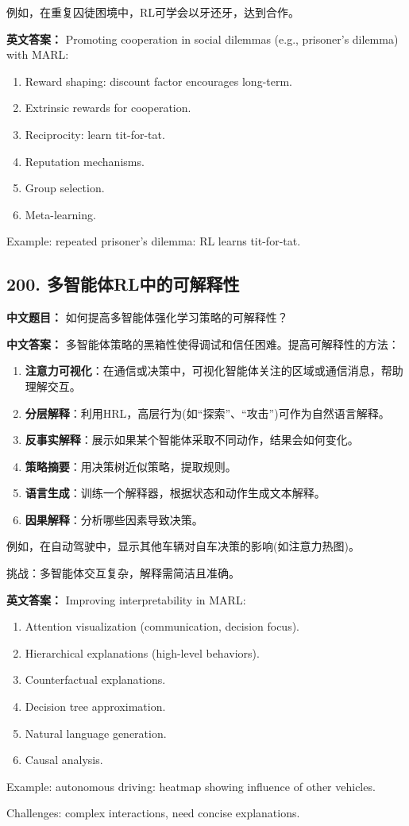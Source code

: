 \documentclass[10pt,a4paper]{ctexart}
\begin{document}
例如，在重复囚徒困境中，RL可学会以牙还牙，达到合作。

\textbf{英文答案：}  
Promoting cooperation in social dilemmas (e.g., prisoner's dilemma) with MARL:

\begin{enumerate}
    \item Reward shaping: discount factor encourages long-term.
    \item Extrinsic rewards for cooperation.
    \item Reciprocity: learn tit-for-tat.
    \item Reputation mechanisms.
    \item Group selection.
    \item Meta-learning.
\end{enumerate}

Example: repeated prisoner's dilemma: RL learns tit-for-tat.

\subsection*{200. 多智能体RL中的可解释性}
\textbf{中文题目：} 如何提高多智能体强化学习策略的可解释性？

\textbf{中文答案：}  
多智能体策略的黑箱性使得调试和信任困难。提高可解释性的方法：

\begin{enumerate}
    \item \textbf{注意力可视化}：在通信或决策中，可视化智能体关注的区域或通信消息，帮助理解交互。
    \item \textbf{分层解释}：利用HRL，高层行为(如“探索”、“攻击”)可作为自然语言解释。
    \item \textbf{反事实解释}：展示如果某个智能体采取不同动作，结果会如何变化。
    \item \textbf{策略摘要}：用决策树近似策略，提取规则。
    \item \textbf{语言生成}：训练一个解释器，根据状态和动作生成文本解释。
    \item \textbf{因果解释}：分析哪些因素导致决策。
\end{enumerate}

例如，在自动驾驶中，显示其他车辆对自车决策的影响(如注意力热图)。

挑战：多智能体交互复杂，解释需简洁且准确。

\textbf{英文答案：}  
Improving interpretability in MARL:
\begin{enumerate}
    \item Attention visualization (communication, decision focus).
    \item Hierarchical explanations (high-level behaviors).
    \item Counterfactual explanations.
    \item Decision tree approximation.
    \item Natural language generation.
    \item Causal analysis.
\end{enumerate}

Example: autonomous driving: heatmap showing influence of other vehicles.

Challenges: complex interactions, need concise explanations.
\end{document}
